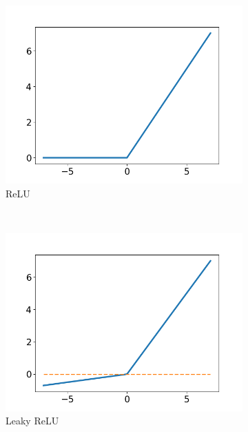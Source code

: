\begin{figure}
  \centering
  \begin{subfigure}[t]{0.3\textwidth}
    \includegraphics[width=\textwidth]{files/figs/relu.png}
    \caption{ReLU}
    \label{fig:relu}
  \end{subfigure}
  ~
  \begin{subfigure}[t]{0.3\textwidth}
    \includegraphics[width=\textwidth]{files/figs/leaky_relu.png}
    \caption{Leaky ReLU}
    \label{fig:leaky-relu}
  \end{subfigure}
  ~
  \begin{subfigure}[t]{0.3\textwidth}

\end{subfigure}
\end{figure}
